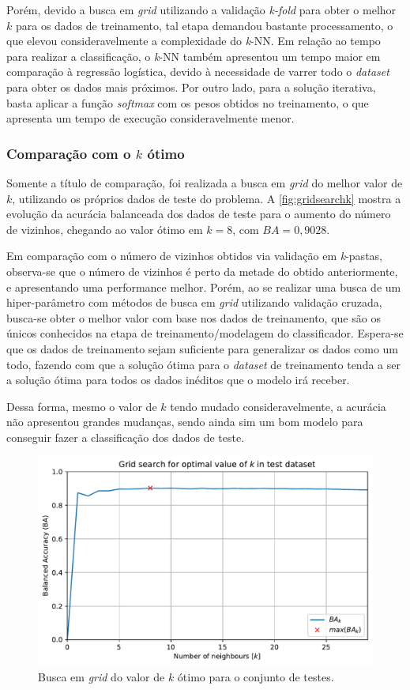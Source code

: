 Porém, devido a busca em \textit{grid} utilizando a validação \textit{k-fold} para obter o melhor $k$ para os dados de treinamento, tal etapa demandou bastante processamento, o que elevou consideravelmente a complexidade do \textit{k}-NN. Em relação ao tempo para realizar a classificação, o \textit{k}-NN também apresentou um tempo maior em comparação à regressão logística, devido à necessidade de varrer todo o \textit{dataset} para obter os dados mais próximos. Por outro lado, para a solução iterativa, basta aplicar a função \textit{softmax} com os pesos obtidos no treinamento, o que apresenta um tempo de execução consideravelmente menor.

\subsubsection*{Comparação com o $k$ ótimo}

Somente a título de comparação, foi realizada a busca em \textit{grid} do melhor valor de $k$, utilizando os próprios dados de teste do problema. A \autoref{fig:gridsearchk} mostra a evolução da acurácia balanceada dos dados de teste para o aumento do número de vizinhos, chegando ao valor ótimo em $k = 8$, com $BA = 0,9028$. 

Em comparação com o número de vizinhos obtidos via validação em \textit{k}-pastas, observa-se que o número de vizinhos é perto da metade do obtido anteriormente, e apresentando uma performance melhor. Porém, ao se realizar uma busca de um hiper-parâmetro com métodos de busca em \textit{grid} utilizando validação cruzada, busca-se obter o melhor valor com base nos dados de treinamento, que são os únicos conhecidos na etapa de treinamento/modelagem do classificador. Espera-se que os dados de treinamento sejam suficiente para generalizar os dados como um todo, fazendo com que a solução ótima para o \textit{dataset} de treinamento tenda a ser a solução ótima para todos os dados inéditos que o modelo irá receber.

Dessa forma, mesmo o valor de $k$ tendo mudado consideravelmente, a acurácia não apresentou grandes mudanças, sendo ainda sim um bom modelo para conseguir fazer a classificação dos dados de teste.

\begin{figure}[H]
	\centering
	\includegraphics[width=0.75\linewidth]{../../plot/knn_1/grid_search}
	\caption{Busca em \textit{grid} do valor de $k$ ótimo para o conjunto de testes.}
	\label{fig:gridsearchk}
\end{figure}


